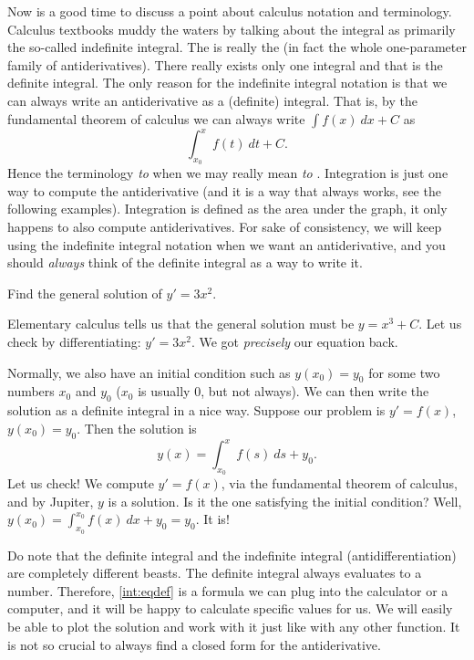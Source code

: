 \documentclass[12pt]{book}
\begin{document}
Now is a good time to discuss a point about
calculus notation and terminology.  Calculus
textbooks muddy the waters by talking about the integral as primarily the
so-called indefinite integral.  The 
is really the \emph{} 
(in fact the whole one-parameter family
of antiderivatives).  There really exists only one integral and that
is the definite integral.
The only reason for the indefinite integral notation is that we can always
write an antiderivative as a (definite) integral.  That is, by the fundamental
theorem of calculus we can always write
$\int f(x) ~dx + C$ as
\begin{equation*}
\int_{x_0}^x f(t) ~dt + C .
\end{equation*}
Hence the terminology \emph{to } when we may really mean
\emph{to }.
Integration is just one way to compute the
antiderivative (and it is a way that always works, see the following
examples).  Integration is defined as the area under the graph, it
only happens to also compute antiderivatives.
For sake of consistency, we will keep using the
indefinite integral notation when we want an antiderivative,
and you should \emph{always} think of the definite integral
as a way to write it.

\begin{example}
Find the general solution of $y' = 3 x^2$.

Elementary calculus tells us
that the general solution must be $y = x^3 + C$.  Let us check by
differentiating:
$y' = 3x^2$.  We got \emph{precisely} our equation back.
\end{example}

Normally, we also have an initial condition such as $y(x_0) = y_0$
for some two numbers $x_0$ and $y_0$ ($x_0$ is usually 0, but not always).
We can then write the solution as a definite integral in a nice way.
Suppose our problem is $y' = f(x)$, $y(x_0) = y_0$.  Then the solution is
\begin{equation} \label{int:eqdef}
y(x) = \int_{x_0}^x f(s) ~ds + y_0 .
\end{equation}
Let us check!
We compute
$y' = f(x)$, via the fundamental theorem of calculus, and by Jupiter, $y$ is a
solution.  Is it the one satisfying the initial condition?  Well,
$y(x_0) = \int_{x_0}^{x_0} f(x)~dx + y_0 = y_0$.  It is!

Do note that the definite integral and the indefinite integral
(antidifferentiation) are completely different beasts.  The definite integral
always evaluates to a number.  Therefore, \eqref{int:eqdef} is a formula we
can plug into the calculator or a computer, and it will be happy to calculate
specific values for us.  We will easily be able to plot the
solution and work with it just like with any other function.
It is not so crucial to always find a
closed form for the antiderivative.
\end{document}
